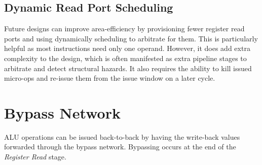 \subsection{Dynamic Read Port Scheduling}

Future designs can improve area-efficiency by provisioning fewer register read ports and using dynamically scheduling to arbitrate for them. This is particularly helpful as most instructions need only one operand.  However, it does add extra complexity to the design, which is often manifested as extra pipeline stages to arbitrate and detect structural hazards.  It also requires the ability to kill issued micro-ops and re-issue them from the issue window on a later cycle. 

\section{Bypass Network}

ALU operations can be issued back-to-back by having the write-back values forwarded through the bypass network. Bypassing occurs at the end of the {\em Register Read} stage. 



